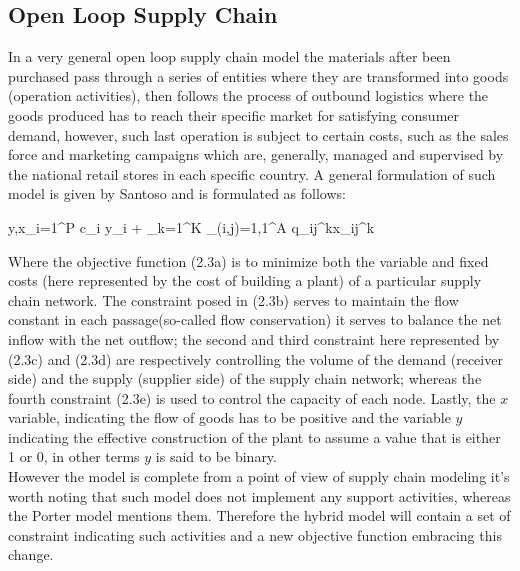 \begin{doublespace}
\subsection{Open Loop Supply Chain}
In a very general open loop supply chain model the materials after been purchased pass through a series of entities where they are transformed into goods (operation activities), then follows the process of outbound logistics where the goods produced has to reach their specific market for satisfying consumer demand, however, such last operation is subject to certain costs, such as the sales force and marketing campaigns which are, generally, managed and supervised by the national retail stores in each specific country.
A general formulation of such model is given by Santoso and is formulated as follows:
\begin{mini!}
	{y,x}{\sum_{i=1}^{P} c_i y_i  + \sum_{k=1}^{K} \sum_{(i,j)=1,1}^{A} q_{ij}^{k}x_{ij}^{k}}{}{}
\end{mini!}

Where the objective function (2.3a) is to minimize both the variable and fixed costs (here represented by the cost of building a plant) of a particular supply chain network.
The constraint posed in (2.3b) serves to maintain the flow constant in each passage(so-called flow conservation) it serves to balance the net inflow with the net outflow; the second and third constraint here represented by (2.3c) and (2.3d) are respectively controlling the volume of the demand (receiver side) and the supply (supplier side) of the supply chain network; whereas the fourth constraint (2.3e) is used to control the capacity of each node. Lastly, the $x$ variable, indicating the flow of goods has to be positive and the variable $y$ indicating the effective construction of the plant to assume a value that is either 1 or 0, in other terms $y$ is said to be binary. 
\\
However the model is complete from a point of view of supply chain modeling it's worth noting that such model does not implement any support activities, whereas the Porter model mentions them. Therefore the hybrid model will contain a set of constraint indicating such activities and a new objective function embracing this change.


\end{doublespace}
